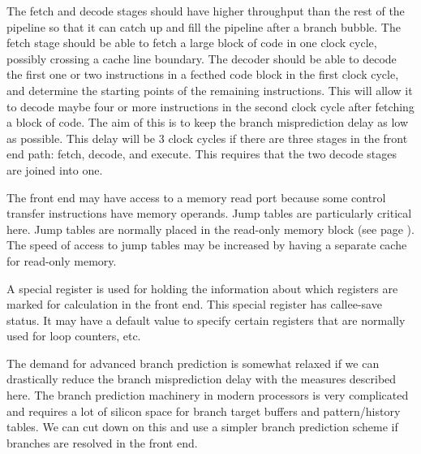 \documentclass[forwardcom.tex]{subfiles}
\begin{document}
The fetch and decode stages should have higher throughput than the rest of the pipeline so that it can catch up and fill the pipeline after a branch bubble. The fetch stage should be able to fetch a large block of code in one clock cycle, possibly crossing a cache line boundary. The decoder should be able to decode the first one or two instructions in a fecthed code block in the first clock cycle, and determine the starting points of the remaining instructions. This will allow it to decode maybe four or more instructions in the second clock cycle after fetching a block of code. The aim of this is to keep the branch misprediction delay as low as possible. This delay will be 3 clock cycles if there are three stages in the front end path: fetch, decode, and execute. This requires that the two decode stages are joined into one.
\vspace{2mm}

The front end may have access to a memory read port because some control transfer instructions have memory operands. Jump tables are particularly critical here. Jump tables are normally placed in the read-only memory block (see page \pageref{memoryModel}). The speed of access to jump tables may be increased by having a separate cache for read-only memory.
\vspace{2mm}

A special register is used for holding the information about which registers are marked for calculation in the front end. This special register has callee-save status. It may have a default value to specify certain registers that are normally used for loop counters, etc.
\vspace{2mm}

The demand for advanced branch prediction is somewhat relaxed if we can drastically reduce the branch misprediction delay with the measures described here. The branch prediction machinery in modern processors is very complicated and requires a lot of silicon space for branch target buffers and pattern/history tables. We can cut down on this and use a simpler branch prediction scheme if branches are resolved in the front end.
\vspace{2mm}
\end{document}
